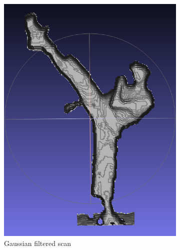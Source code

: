 \documentclass[pdftex,10.5pt]{report}
\begin{document}
\begin{figure}
    \centering
    \begin{subfigure}[H]{0.4\textwidth}
        \includegraphics[width=\textwidth]{figures/filter}
        \caption{Gaussian filtered scan}
    \end{subfigure}
    \begin{subfigure}[H]{0.4\textwidth}

\end{subfigure}
\end{figure}
\end{document}
